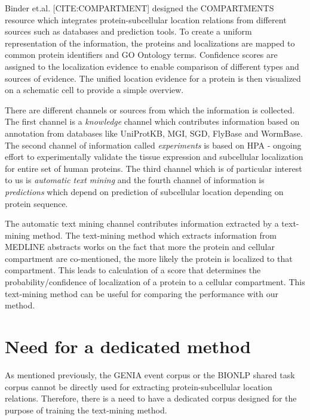 Binder et.al. [CITE:COMPARTMENT] designed the COMPARTMENTS resource which integrates protein-subcellular location relations from different sources such as databases and prediction tools. To create a uniform representation of the information, the proteins and localizations are mapped to common protein identifiers and GO Ontology terms. Confidence scores are assigned to the localization evidence to enable comparison of different types and sources of evidence. The unified location evidence for a protein is then visualized on a schematic cell to  provide a simple overview.

There are different channels or sources from which the information is collected. The first channel is a \textit{knowledge} channel which contributes information based on annotation from databases like UniProtKB, MGI, SGD, FlyBase and WormBase. The second channel of information called \textit{experiments} is based on HPA - ongoing effort to experimentally validate  the tissue expression and subcellular localization for entire set of human proteins. The third channel which is of particular interest to us is \textit{automatic text mining} and the fourth channel of information is \textit{predictions} which depend on prediction of subcellular location depending on protein sequence.

The automatic text mining channel contributes information extracted by a text-mining method. The text-mining method which extracts information from MEDLINE abstracts works on the fact that more the protein and cellular compartment are co-mentioned, the more likely the protein is localized to that compartment. This leads to calculation of a score that determines the probability/confidence of localization of a protein to a cellular compartment. This text-mining method can be useful for comparing the performance with our method.

\section{Need for a dedicated method}
%

As mentioned previously, the GENIA event corpus or the BIONLP shared task corpus cannot be directly used for extracting protein-subcellular location relations. Therefore, there is a need to have a dedicated corpus designed for the purpose of training the text-mining method.

